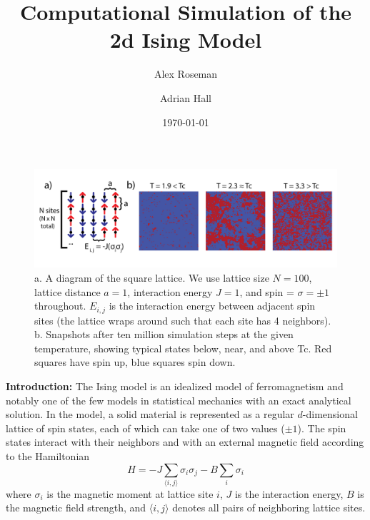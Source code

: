 \documentclass[letter,scriptaddress,twocolumn, prl,nofootinbib]{revtex4}
\begin{document}
\title{Computational Simulation of the 2d Ising Model}

\author{Alex Roseman}
\author{Adrian Hall}
\date{\today}

\begin{abstract}

\end{abstract}

\maketitle

\begin{figure}[t]
	\begin{center}
		\includegraphics[width=1\textwidth]{figs/fig1.png}
		\caption{a. A diagram of the square lattice. We use lattice size $N = 100$, lattice distance $a = 1$, interaction energy $J = 1$, and spin = $\sigma = \pm 1$ throughout. $E_{i, j}$ is the interaction energy between adjacent spin sites (the lattice wraps around such that each site has 4 neighbors). b. Snapshots after ten million simulation steps at the given temperature, showing typical states below, near, and above Tc. Red squares have spin up, blue squares spin down.}
		\label{fig:fig1}
	\end{center}
\end{figure}

\textbf{Introduction:} The Ising model is an idealized model of ferromagnetism and notably one of the few models in statistical mechanics with an exact analytical solution. In the model, a solid material is represented as a regular $d$-dimensional lattice of spin states, each of which can take one of two values ($\pm 1$). The spin states interact with their neighbors and with an external magnetic field according to the Hamiltonian
\begin{equation}
	\label{eq:hamiltonian}
	H = -J \sum_{\langle i, j \rangle} \sigma_i \sigma_j - B \sum_i \sigma_i
\end{equation}
where $\sigma_i$ is the magnetic moment at lattice site $i$, $J$ is the interaction energy, $B$ is the magnetic field strength, and $\langle i, j \rangle$ denotes all pairs of neighboring lattice sites.
\end{document}
